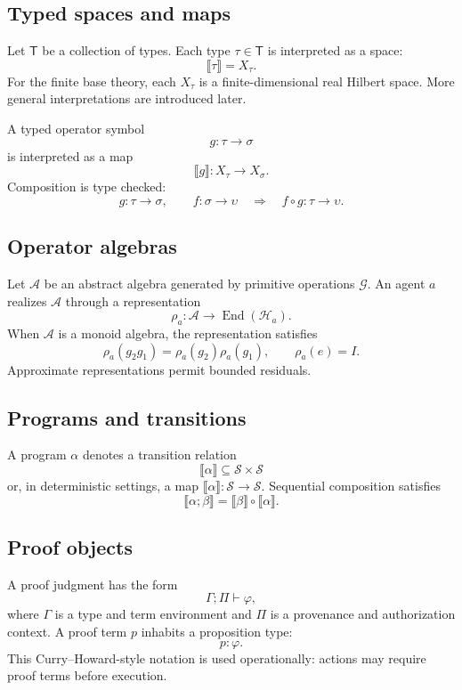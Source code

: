 \documentclass[11pt]{article}
\theoremstyle{definition}
\theoremstyle{remark}
\newcommand{\Lat}{\mathcal H}
\newcommand{\Sem}[1]{\llbracket #1\rrbracket}
\newcommand{\End}{\operatorname{End}}
\begin{document}
\subsection{Typed spaces and maps}

Let \(\mathsf T\) be a collection of types. Each type \(\tau\in\mathsf T\) is interpreted as a space:
\[
\Sem{\tau}=X_\tau.
\]
For the finite base theory, each \(X_\tau\) is a finite-dimensional real Hilbert space. More general interpretations are introduced later.

A typed operator symbol
\[
g:\tau\to\sigma
\]
is interpreted as a map
\[
\Sem{g}:X_\tau\to X_\sigma.
\]
Composition is type checked:
\[
g:\tau\to\sigma,
\qquad
f:\sigma\to\upsilon
\quad\Longrightarrow\quad
f\circ g:\tau\to\upsilon.
\]

\subsection{Operator algebras}

Let \(\mathcal A\) be an abstract algebra generated by primitive operations \(\mathcal G\). An agent \(a\) realizes \(\mathcal A\) through a representation
\[
\rho_a:\mathcal A\to\End(\Lat_a).
\]
When \(\mathcal A\) is a monoid algebra, the representation satisfies
\[
\rho_a(g_2g_1)=\rho_a(g_2)\rho_a(g_1),
\qquad
\rho_a(e)=I.
\]
Approximate representations permit bounded residuals.

\subsection{Programs and transitions}

A program \(\alpha\) denotes a transition relation
\[
\Sem{\alpha}\subseteq\mathcal S\times\mathcal S
\]
or, in deterministic settings, a map \(\Sem{\alpha}:\mathcal S\to\mathcal S\). Sequential composition satisfies
\[
\Sem{\alpha;\beta}
=
\Sem{\beta}\circ\Sem{\alpha}.
\]

\subsection{Proof objects}

A proof judgment has the form
\[
\Gamma;\Pi\vdash\varphi,
\]
where \(\Gamma\) is a type and term environment and \(\Pi\) is a provenance and authorization context. A proof term \(p\) inhabits a proposition type:
\[
p:\varphi.
\]
This Curry--Howard-style notation is used operationally: actions may require proof terms before execution.
\end{document}
